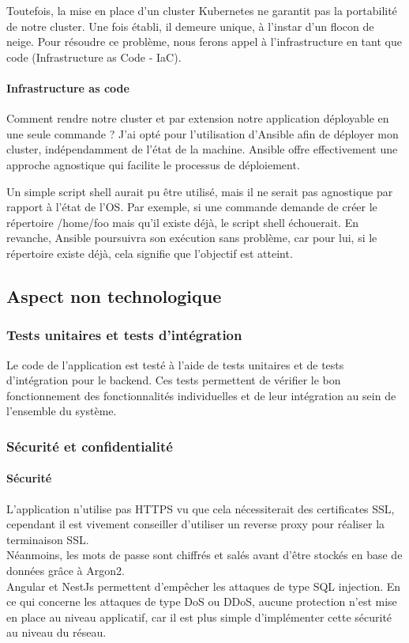 Toutefois, la mise en place d'un cluster Kubernetes ne garantit pas la portabilité de notre cluster.
Une fois établi, il demeure unique, à l'instar d'un flocon de neige.
Pour résoudre ce problème, nous ferons appel à l'infrastructure en tant que code (Infrastructure as Code - IaC).

\paragraph{Infrastructure as code}
Comment rendre notre cluster et par extension notre application déployable en une seule commande ?
J'ai opté pour l'utilisation d'Ansible afin de déployer mon cluster, indépendamment de l'état de la machine.
Ansible offre effectivement une approche agnostique qui facilite le processus de déploiement.

Un simple script shell aurait pu être utilisé, mais il ne serait pas agnostique par rapport à l'état de l'OS\@.
Par exemple, si une commande demande de créer le répertoire /home/foo mais qu'il existe déjà, le script shell échouerait.
En revanche, Ansible poursuivra son exécution sans problème, car pour lui, si le répertoire existe déjà, cela signifie que l'objectif est atteint.

\subsection{Aspect non technologique}\label{subsec:aspect-non-technologique}

\subsubsection{Tests unitaires et tests d'intégration}

Le code de l'application est testé à l'aide de tests unitaires et de tests d'intégration pour le backend.
Ces tests permettent de vérifier le bon fonctionnement des fonctionnalités individuelles et de leur intégration au sein de l'ensemble du système.

\subsubsection{Sécurité et confidentialité}

\paragraph{Sécurité}
L'application n'utilise pas HTTPS vu que cela nécessiterait des certificates SSL, cependant il est vivement conseiller d'utiliser un reverse proxy pour réaliser la terminaison SSL.\\
Néanmoins, les mots de passe sont chiffrés et salés avant d'être stockés en base de données grâce à Argon2.\\
Angular et NestJs permettent d'empêcher les attaques de type SQL injection.
En ce qui concerne les attaques de type DoS ou DDoS, aucune protection n'est mise en place au niveau applicatif, car il est plus simple d'implémenter cette sécurité au niveau du réseau.\\\\

